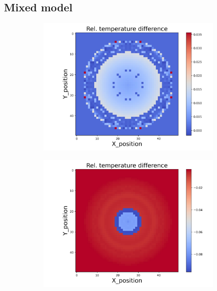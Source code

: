 \subsection{Mixed model}
\begin{figure}[h]
    \centering
    \begin{minipage}{\textwidth}
        \centering
        \begin{subfigure}{0.325\textwidth}
            \centering
            \includegraphics[width=\textwidth]{figures/raw_data/0/mix/T_bias.jpg}
        \end{subfigure}
        \begin{subfigure}{0.325\textwidth}
            \centering
            \includegraphics[width=\textwidth]{figures/raw_data/5/mix/T_bias.jpg}

\end{subfigure}
\end{minipage}
\end{figure}
